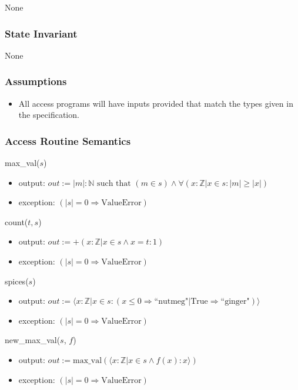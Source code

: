\documentclass[12pt,fleqn]{examtst}
\begin{document}
None

\subsubsection* {State Invariant}

None

\subsubsection* {Assumptions}

\begin{itemize}
\item All access programs will have inputs provided that match the types
  given in the specification.
\end{itemize}

\subsubsection* {Access Routine Semantics}

\noindent max\_val($s$)
\begin{itemize}
\item output: $\mathit{out} := | m |: \mathbb{N} \text{ such that } (m \in s) \wedge
  \forall (x: \mathbb{Z} | x \in s : | m | \geq | x |)$
\item exception: $(|s| = 0 \Rightarrow \text{ValueError})$
\end{itemize}

\noindent count($t, s$)
\begin{itemize}
\item output: $\mathit{out} := + (x: \mathbb{Z} | x \in s \wedge x = t : 1)$
\item exception: $(|s| = 0 \Rightarrow \text{ValueError})$
\end{itemize}

\noindent spices($s$)
\begin{itemize}
\item output: $\mathit{out} := \langle x: \mathbb{Z} | x \in s : (x \leq 0
  \Rightarrow \text{``nutmeg"} | \text{True} \Rightarrow \text{``ginger"}) \rangle$
\item exception: $(|s| = 0 \Rightarrow \text{ValueError})$
\end{itemize}

\noindent new\_max\_val($s$, $f$)
\begin{itemize}
\item output: $\mathit{out} := \text{max\_val}(\langle x: \mathbb{Z} | x \in s
  \wedge f(x): x \rangle )$
\item exception: $(|s| = 0 \Rightarrow \text{ValueError})$
\end{itemize}
\end{document}
